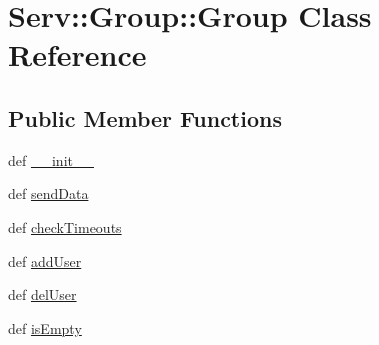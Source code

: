 \hypertarget{class_serv_1_1_group_1_1_group}{
\section{Serv::Group::Group Class Reference}
\label{class_serv_1_1_group_1_1_group}
}
\subsection*{Public Member Functions}
\begin{CompactItemize}
\item 
def \hyperlink{class_serv_1_1_group_1_1_group_ee5bd24c2c39d9c06c11aec410690c3d}{\_\-\_\-init\_\-\_\-}
\item 
def \hyperlink{class_serv_1_1_group_1_1_group_cbb0137781676208d4de16b90d8d9cc0}{sendData}
\item 
def \hyperlink{class_serv_1_1_group_1_1_group_ff52dadf0f67e54340f9602cc3a6fbba}{checkTimeouts}
\item 
def \hyperlink{class_serv_1_1_group_1_1_group_0a4183d2362794bd55741a35e4b5a91d}{addUser}
\item 
def \hyperlink{class_serv_1_1_group_1_1_group_48768b6b5440e56d42d632085b2a8aef}{delUser}
\item 
def \hyperlink{class_serv_1_1_group_1_1_group_51e7ce8393ee398260d4e12e904da5ab}{isEmpty}
\end{CompactItemize}
